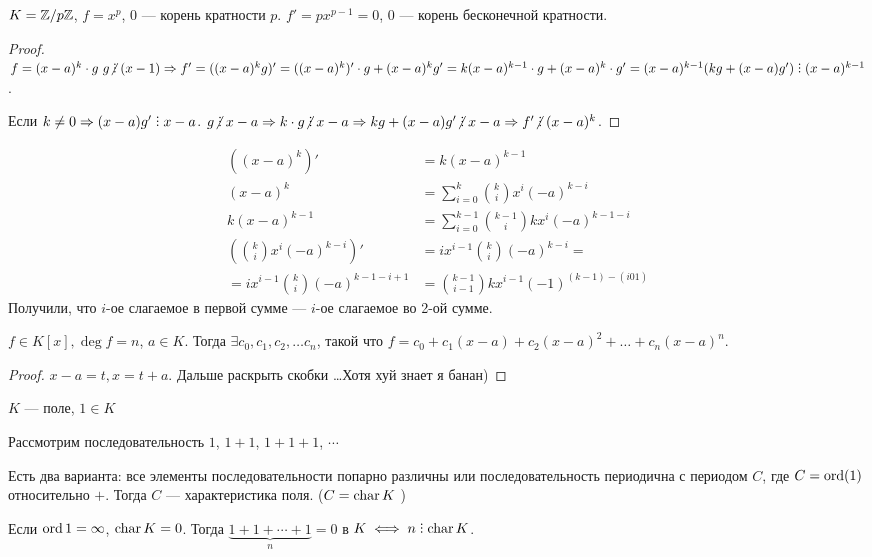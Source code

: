  \begin{example}
     $K = \mathbb{Z} / p\mathbb{Z}$,  $f = x^p$, 0 --- корень кратности  $p$.  $f' = p x^{p-1} = 0$, $0$ --- корень бесконечной кратности.
\end{example}
\begin{proof}
    $f = (x-a)^k \cdot g\ g \centernot \divby (x-1) \Rightarrow f' = ((x-a)^k g)' = ((x-a)^k)' \cdot g + (x-a)^k g' = k(x-a)^{k-1} \cdot g + (x-a)^k \cdot g' = (x-a)^{k-1} (kg + (x-a)g') \divby (x-a)^{k-1}$. 

    Если $k \neq 0 \Rightarrow (x-a)g' \divby x-a$. $g \centernot \divby x-a \Rightarrow k \cdot g \centernot \divby x-a \Rightarrow kg + (x-a)g' \centernot \divby x-a \Rightarrow f' \centernot \divby (x-a)^k$. 
\end{proof}
\begin{lemma}
    \begin{align*}    
        ((x-a)^k)' &= k(x-a)^{k-1}\\
        (x-a)^k &= \sum_{i=0}^k \binom{k}{i} x^i (-a)^{k-i} \\
        k(x-a)^{k-1} &= \sum_{i=0}^{k-1} \binom{k-1}{i} kx^i(-a)^{k-1-i}\\
        (\binom{k}{i} x^i(-a)^{k-i})' &= ix^{i-1} \binom{k}{i} (-a)^{k-i} = \\
        = i x^{i-1} \binom{k}{i}(-a)^{k-1 - i + 1} &= \binom{k-1}{i-1}kx^{i-1}(-1)^{(k-1) - (i 0 1)}
    \end{align*}
    Получили, что $i$-ое слагаемое в первой сумме --- $i$-ое слагаемое во 2-ой сумме.
\end{lemma}
\begin{statement}
    $f \in K[x], \deg f = n$,  $a \in K$. Тогда  $\exists c_0, c_1,c_2,\ldots c_n$, такой что $f = c_0 + c_1(x-a) + c_2(x-a)^2 + \ldots + c_n(x-a)^n$.
\end{statement}
\begin{proof}
    $x-a = t, x = t+a$. Дальше раскрыть скобки \ldots Хотя хуй знает я банан)
\end{proof}
$K$ --- поле,  $1 \in K$

Рассмотрим последовательность $1$, $1 + 1$, $1 + 1 + 1$, $\cdots$

\begin{definition}
	Есть два варианта: все элементы последовательности попарно различны или последовательность периодична с периодом  $C$, где  $C = \operatorname{ord}(1)$ относительно  $+$. Тогда $C$ --- характеристика поля. ($C = \operatorname{char} K$ )
\end{definition}
Если $\operatorname{ord} 1 = \infty$, $\operatorname{char} K = 0$. Тогда $\underbrace{1 + 1 + \cdots + 1}_n = 0$ в  $K \iff n \divby \charr K$.

